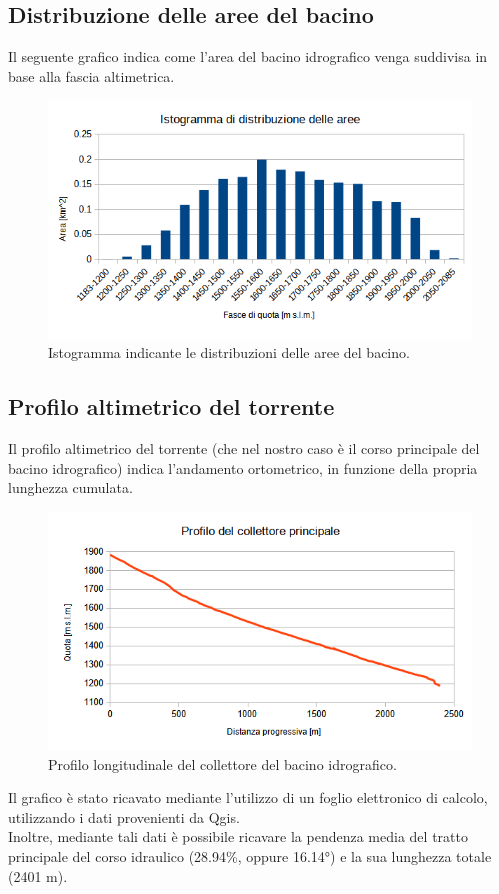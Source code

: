 \subsection{Distribuzione delle aree del bacino}
Il seguente grafico indica come l'area del bacino idrografico venga suddivisa in base alla fascia altimetrica.
\begin{figure}[H] \centering
    \includegraphics[scale=0.8]{immagini/istogramma_distribuzione_aree.png}
    \caption{Istogramma indicante le distribuzioni delle aree del bacino.}
\end{figure}

\subsection{Profilo altimetrico del torrente}
Il profilo altimetrico del torrente (che nel nostro caso è il corso principale del bacino idrografico) indica l'andamento ortometrico, in funzione della propria lunghezza cumulata.
\begin{figure}[H] \centering
    \includegraphics[scale=0.8]{immagini/prof_coll_princ.png}
    \caption{Profilo longitudinale del collettore del bacino idrografico.}
\end{figure}
Il grafico è stato ricavato mediante l'utilizzo di un foglio elettronico di calcolo, utilizzando i dati provenienti da Qgis.\\
Inoltre, mediante tali dati è possibile ricavare la pendenza media del tratto principale del corso idraulico (28.94\%, oppure 16.14°) e la sua lunghezza totale (2401 \unit{m}).


